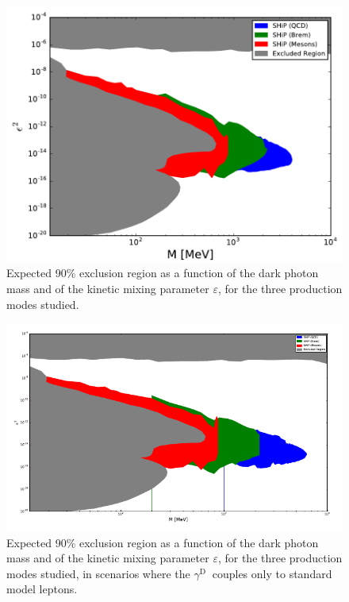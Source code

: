 \documentclass[12pt,a4paper,]{article}
\newcommand{\mathDP}{\gamma^{\mathrm{D}}\ }
\newcommand{\DP}{$\mathDP$}
\begin{document}
\begin{figure}[h!]
  \centering
\includegraphics[width=1.\textwidth]{figures/sensitivity.png}
\caption{Expected 90\% exclusion region as a function of the dark
  photon mass and of the kinetic mixing parameter $\varepsilon$, for
  the three production modes studied.}
\label{fig:sensitivity}
\end{figure}

\begin{figure}[h!]
  \centering
\includegraphics[width=1.\textwidth]{figures/sensitivityLeptophilic.png}
\caption{Expected 90\% exclusion region as a function of the dark
  photon mass and of the kinetic mixing parameter $\varepsilon$, for
  the three production modes studied, in scenarios where the \DP
  couples only to standard model leptons.}
\label{fig:sensitivityLep}
\end{figure}
\end{document}

